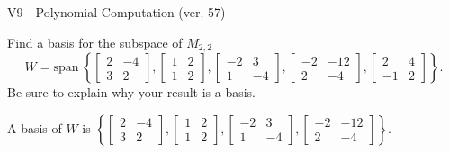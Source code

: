 \begin{exercise}
  \begin{exerciseTitle}V9 - Polynomial Computation (ver. 57)\end{exerciseTitle}
  \begin{exerciseStatement}
    Find a basis for the subspace of \(M_{2,2}\) 
\[W=\mathrm{span}\ \left\{\left[\begin{array}{cc}
2 & -4 \\
3 & 2
\end{array}\right] , \left[\begin{array}{cc}
1 & 2 \\
1 & 2
\end{array}\right] , \left[\begin{array}{cc}
-2 & 3 \\
1 & -4
\end{array}\right] , \left[\begin{array}{cc}
-2 & -12 \\
2 & -4
\end{array}\right] , \left[\begin{array}{cc}
2 & 4 \\
-1 & 2
\end{array}\right]\right\}.\]
 Be sure to explain why your result is a basis.


  \end{exerciseStatement}
  \begin{exerciseAnswer}
   A basis of \(W\) is  \(\left\{\left[\begin{array}{cc}
2 & -4 \\
3 & 2
\end{array}\right] , \left[\begin{array}{cc}
1 & 2 \\
1 & 2
\end{array}\right] , \left[\begin{array}{cc}
-2 & 3 \\
1 & -4
\end{array}\right] , \left[\begin{array}{cc}
-2 & -12 \\
2 & -4
\end{array}\right]\right\}\).
  


  \end{exerciseAnswer}
\end{exercise}